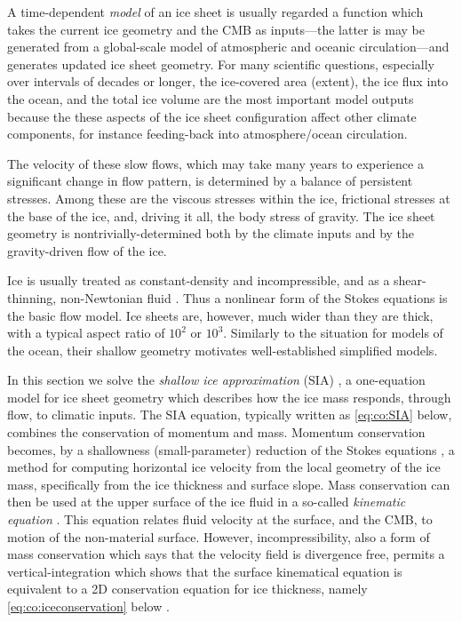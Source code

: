 \documentclass[final,leqno,onefignum,onetabnum]{siamltex1213bueler}
\begin{document}
A time-dependent \emph{model} of an ice sheet is usually regarded a function which takes the current ice geometry and the CMB as inputs---the latter is may be generated from a global-scale model of atmospheric and oceanic circulation---and generates updated ice sheet geometry.  For many scientific questions, especially over intervals of decades or longer, the ice-covered area (extent), the ice flux into the ocean, and the total ice volume are the most important model outputs because the these aspects of the ice sheet configuration affect other climate components, for instance feeding-back into atmosphere/ocean circulation.

The velocity of these slow flows, which may take many years to experience a significant change  in flow pattern, is determined by a balance of persistent stresses.  Among these are the viscous stresses within the ice, frictional stresses at the base of the ice, and, driving it all, the body stress of gravity.  The ice sheet geometry is nontrivially-determined both by the climate inputs and by the gravity-driven flow of the ice.

Ice is usually treated as constant-density and incompressible, and as a shear-thinning, non-Newtonian fluid \cite{GreveBlatter2009}.  Thus a nonlinear form of the Stokes equations is the basic flow model.  Ice sheets are, however, much wider than they are thick, with a typical aspect ratio of $10^2$ or $10^{3}$.  Similarly to the situation for models of the ocean, their shallow geometry motivates well-established simplified models.

In this section we solve the \emph{shallow ice approximation} (SIA) \cite{GreveBlatter2009}, a one-equation model for ice sheet geometry which describes how the ice mass responds, through flow, to climatic inputs.  The SIA equation, typically written as \eqref{eq:co:SIA} below, combines the conservation of momentum and mass.  Momentum conservation becomes, by a shallowness (small-parameter) reduction of the Stokes equations \cite[Chapter 18]{Fowler1997}, a method for computing horizontal ice velocity from the local geometry of the ice mass, specifically from the ice thickness and surface slope.  Mass conservation can then be used at the upper surface of the ice fluid in a so-called \emph{kinematic equation} \cite{Acheson1990}.  This equation relates fluid velocity at the surface, and the CMB, to motion of the non-material surface.  However, incompressibility, also a form of mass conservation which says that the velocity field is divergence free, permits a vertical-integration which shows that the surface kinematical equation is equivalent to a 2D conservation equation for ice thickness, namely \eqref{eq:co:iceconservation} below \cite{Fowler1997}.
\end{document}
